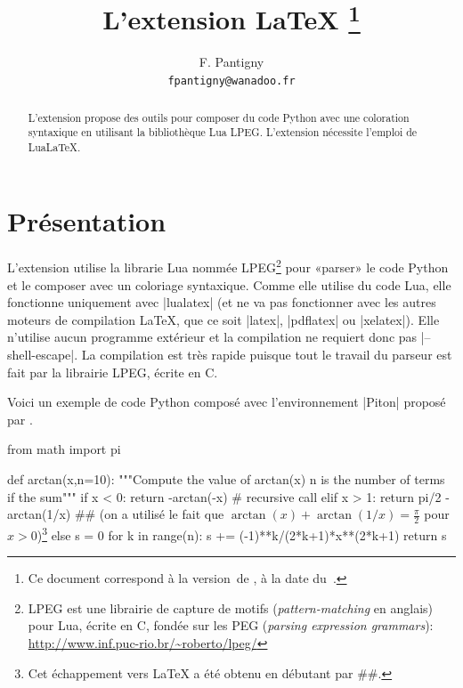 \documentclass[dvipsnames]{article}
\begin{document}
\VerbatimFootnotes


\title{L'extension LaTeX \thanks{Ce document correspond à la 
version~\myfileversion\space de , à la date du~\myfiledate.}} 
\author{F. Pantigny \\ \texttt{fpantigny@wanadoo.fr}}

\maketitle

\begin{abstract}
L'extension  propose des outils pour composer du code Python avec une coloration syntaxique
en utilisant la bibliothèque Lua LPEG. L'extension  nécessite l'emploi de LuaLaTeX.
\end{abstract}

\section{Présentation}

L'extension  utilise la librarie Lua nommée LPEG\footnote{LPEG est une librairie de capture de motifs
  (\emph{pattern-matching} en anglais) pour Lua, écrite en C, fondée sur les PEG (\emph{parsing expression
    grammars}): \url{http://www.inf.puc-rio.br/~roberto/lpeg/}} pour «parser» le code Python et le composer avec un
coloriage syntaxique. Comme elle utilise du code Lua, elle fonctionne uniquement avec |lualatex| (et ne va pas
fonctionner avec les autres moteurs de compilation LaTeX, que ce soit |latex|, |pdflatex| ou |xelatex|). Elle
n'utilise aucun programme extérieur et la compilation ne requiert donc pas |--shell-escape|. La compilation est
très rapide puisque tout le travail du parseur est fait par la librairie LPEG, écrite en C.

\bigskip
Voici un exemple de code Python composé avec l'environnement |{Piton}| proposé par .

\bigskip
\begin{Piton}
from math import pi

def arctan(x,n=10):
    """Compute the value of arctan(x)
       n is the number of terms if the sum"""
    if x < 0:
         return -arctan(-x) # recursive call
    elif x > 1: 
         return pi/2 - arctan(1/x) 
         ## (on a utilisé le fait que $\arctan(x)+\arctan(1/x)=\frac{\pi}{2}$ pour $x>0$)\footnote{Cet échappement vers LaTeX a été obtenu en débutant par \ttfamily\#\#.}
    else 
         s = 0
         for k in range(n):
              s += (-1)**k/(2*k+1)*x**(2*k+1)
         return s 
\end{Piton}
\end{document}
